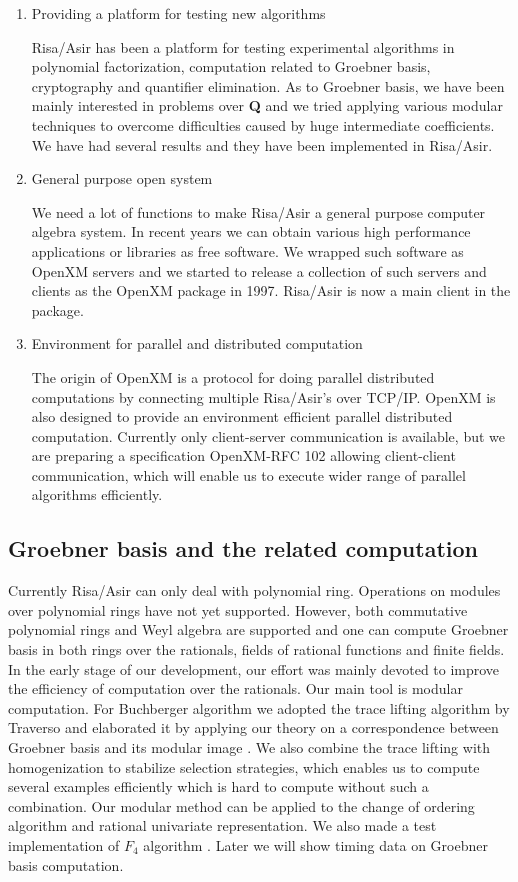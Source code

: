 \documentclass[runningheads]{cl2emult}
\begin{document}
\begin{enumerate}
\item Providing a platform for testing new algorithms

Risa/Asir has been a platform for testing experimental algorithms in
polynomial factorization, computation related to Groebner basis,
cryptography and quantifier elimination. As to Groebner basis, we have
been mainly interested in problems over {\bf Q} and we tried applying
various modular techniques to overcome difficulties caused by huge
intermediate coefficients. We have had several results and they have
been implemented in Risa/Asir.

\item General purpose open system

We need a lot of functions to make Risa/Asir a general purpose
computer algebra system.  In recent years we can obtain various high
performance applications or libraries as free software. We wrapped
such software as OpenXM servers and we started to release a collection
of such servers and clients as the OpenXM package in 1997. Risa/Asir
is now a main client in the package.

\item Environment for parallel and distributed computation

The origin of OpenXM is a protocol for doing parallel distributed
computations by connecting multiple Risa/Asir's over TCP/IP. OpenXM is
also designed to provide an environment efficient parallel distributed
computation. Currently only client-server communication is available,
but we are preparing a specification OpenXM-RFC 102 allowing
client-client communication, which will enable us to execute wider
range of parallel algorithms efficiently.
\end{enumerate}

\subsection{Groebner basis and the related computation}

Currently Risa/Asir can only deal with polynomial ring. Operations on
modules over polynomial rings have not yet supported.  However, both
commutative polynomial rings and Weyl algebra are supported and one
can compute Groebner basis in both rings over the rationals, fields of
rational functions and finite fields. In the early stage of our
development, our effort was mainly devoted to improve the efficiency
of computation over the rationals. Our main tool is modular
computation. For Buchberger algorithm we adopted the trace lifting
algorithm by Traverso \cite{TRAV} and elaborated it by applying our
theory on a correspondence between Groebner basis and its modular
image \cite{NOYO}. We also combine the trace lifting with
homogenization to stabilize selection strategies, which enables us to
compute several examples efficiently which is hard to compute without
such a combination.  Our modular method can be applied to the change
of ordering algorithm and rational univariate representation.  We also
made a test implementation of $F_4$ algorithm \cite{F4}. Later we will
show timing data on Groebner basis computation.
\end{document}

